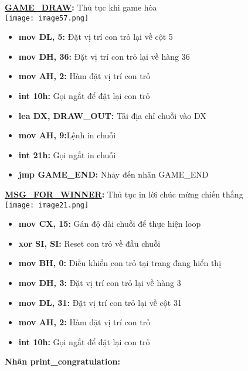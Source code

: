 \textbf{\underline{GAME\_DRAW}: }Thủ tục khi game hòa\\
\texttt{[image: image57.png]}

\begin{itemize}
    \item \textbf{mov DL, 5: }Đặt vị trí con trỏ lại về cột 5 
    \item \textbf{mov DH, 36:} Đặt vị trí con trỏ lại về hàng 36
    \item \textbf{mov AH, 2: }Hàm đặt vị trí con trỏ
    \item \textbf{int 10h:} Gọi ngắt để đặt lại con trỏ
    \item \textbf{lea DX, DRAW\_OUT:} Tải địa chỉ chuỗi vào DX
    \item \textbf{mov AH, 9:}Lệnh in chuỗi
    \item \textbf{int 21h:} Gọi ngắt in chuỗi
    \item \textbf{jmp GAME\_END:} Nhảy đến nhãn GAME\_END
\end{itemize}
\textbf{\underline{MSG\_FOR\_WINNER}: }Thủ tục in lời chúc mừng chiến thắng\\
\texttt{[image: image21.png]}
\begin{itemize}
    \item \textbf{mov CX, 15:} Gán độ dài chuỗi để thực hiện loop
    \item \textbf{xor SI, SI:} Reset con trỏ về đầu chuỗi
    \item \textbf{mov BH, 0: }Điều khiển con trỏ tại trang đang hiển thị 
    \item \textbf{mov DH, 3: }Đặt vị trí con trỏ lại về hàng 3
    \item \textbf{mov DL, 31:} Đặt vị trí con trỏ lại về cột 31
    \item \textbf{mov AH, 2: }Hàm đặt vị trí con trỏ
    \item \textbf{int 10h:} Gọi ngắt để đặt lại con trỏ
\end{itemize}

\textbf{Nhãn print\_congratulation:}

